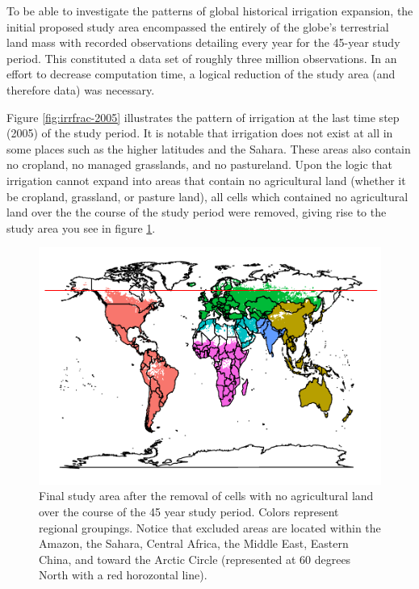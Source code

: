\documentclass[12pt,twoside]{reedthesis}
\begin{document}
To be able to investigate the patterns of global historical irrigation expansion, the initial proposed study area encompassed the entirely of the globe's terrestrial land mass with recorded observations detailing every year for the 45-year study period. This constituted a data set of roughly three million observations. In an effort to decrease computation time, a logical reduction of the study area (and therefore data) was necessary.

Figure \ref{fig:irrfrac-2005} illustrates the pattern of irrigation at the last time step (2005) of the study period. It is notable that irrigation does not exist at all in some places such as the higher latitudes and the Sahara. These areas also contain no cropland, no managed grasslands, and no pastureland. Upon the logic that irrigation cannot expand into areas that contain no agricultural land (whether it be cropland, grassland, or pasture land), all cells which contained no agricultural land over the the course of the study period were removed, giving rise to the study area you see in figure \ref{fig:study-region-nocrop}.
\begin{figure}
\centering
\includegraphics{thesis_files/figure-latex/study-region-nocrop-1.pdf}
\caption{\label{fig:study-region-nocrop}Final study area after the removal of cells with no agricultural land over the course of the 45 year study period. Colors represent regional groupings. Notice that excluded areas are located within the Amazon, the Sahara, Central Africa, the Middle East, Eastern China, and toward the Arctic Circle (represented at 60 degrees North with a red horozontal line).}
\end{figure}
\hypertarget{section-1}{%
\section{}\label{section-1}}
\end{document}
